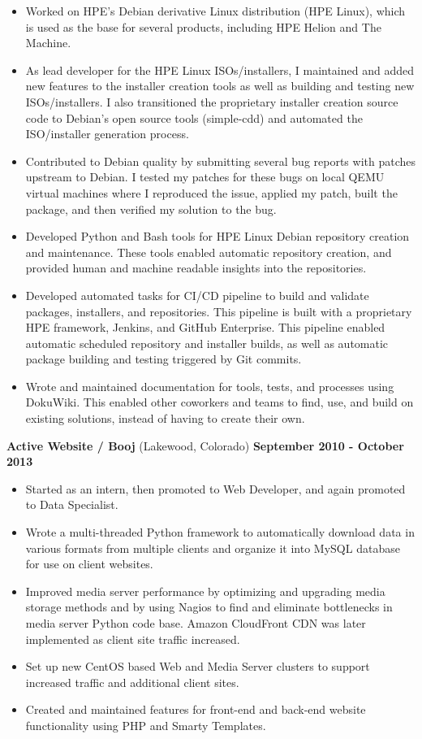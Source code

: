 \documentclass[letterpaper,10pt]{article}
\begin{document}
        \begin{itemize}
            \item Worked on HPE's Debian derivative Linux distribution (HPE Linux), which is used as the base for several products, including HPE Helion and The Machine.
            \item As lead developer for the HPE Linux ISOs/installers, I maintained and added new features to the installer creation tools as well as building and testing new ISOs/installers. I also transitioned the proprietary installer creation source code to Debian's open source tools (simple-cdd) and automated the ISO/installer generation process.
            \item Contributed to Debian quality by submitting several bug reports with patches upstream to Debian. I tested my patches for these bugs on local QEMU virtual machines where I reproduced the issue, applied my patch, built the package, and then verified my solution to the bug.
            \item Developed Python and Bash tools for HPE Linux Debian repository creation and maintenance. These tools enabled automatic repository creation, and provided human and machine readable insights into the repositories.
            \item Developed automated tasks for CI/CD pipeline to build and validate packages, installers, and repositories. This pipeline is built with a proprietary HPE framework, Jenkins, and GitHub Enterprise. This pipeline enabled automatic scheduled repository and installer builds, as well as automatic package building and testing triggered by Git commits.
            \item Wrote and maintained documentation for tools, tests, and processes using DokuWiki. This enabled other coworkers and teams to find, use, and build on existing solutions, instead of having to create their own.
        \end{itemize}
        \vspace*{1.5ex}
        \textbf{Active Website / Booj} (Lakewood, Colorado) \hfill \textbf{September 2010 - October 2013}
        \begin{itemize}
            \item Started as an intern, then promoted to Web Developer, and again promoted to Data Specialist.
            \item Wrote a multi-threaded Python framework to automatically download data in various formats from multiple clients and organize it into MySQL database for use on client websites.
            \item Improved media server performance by optimizing and upgrading media storage methods and by using Nagios to find and eliminate bottlenecks in media server Python code base. Amazon CloudFront CDN was later implemented as client site traffic increased.
            \item Set up new CentOS based Web and Media Server clusters to support increased traffic and additional client sites.
            \item Created and maintained features for front-end and back-end website functionality using PHP and Smarty Templates.
        \end{itemize}
\end{document}
